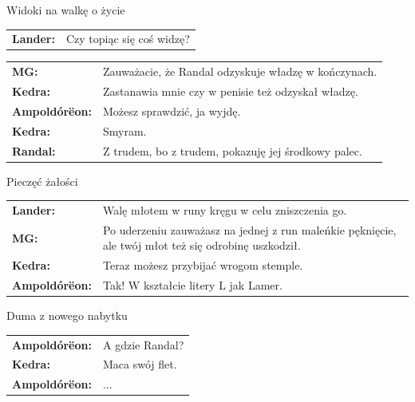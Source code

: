 \documentclass[10pt,twoside,twocolumn]{book}
\begin{document}
\begin{rpg-quotebox}{Widoki na walkę o życie}
   \begin{tabularx}{\columnwidth}{lX}
      \textbf{Lander:} & Czy topiąc się coś widzę?\\
   \end{tabularx}
\end{rpg-quotebox}


\begin{rpg-quotebox}{}
   \begin{tabularx}{\columnwidth}{lX}
      \textbf{MG:} & Zauważacie, że Randal odzyskuje władzę w kończynach.\\
      \textbf{Kedra:} & Zastanawia mnie czy w penisie też odzyskał władzę.\\
      \textbf{Ampoldórëon:} & Możesz sprawdzić, ja wyjdę.\\
      \textbf{Kedra:} & Smyram.\\
      \textbf{Randal:} & Z trudem, bo z trudem, pokazuję jej środkowy palec.\\
   \end{tabularx}
\end{rpg-quotebox}


\begin{rpg-quotebox}{Pieczęć żałości}
   \begin{tabularx}{\columnwidth}{lX}
      \textbf{Lander:} & Walę młotem w runy kręgu w celu zniszczenia go.\\
      \textbf{MG:} & Po uderzeniu zauważasz na jednej z run maleńkie pęknięcie, ale twój młot też się odrobinę uszkodził.\\
      \textbf{Kedra:} & Teraz możesz przybijać wrogom stemple.\\
      \textbf{Ampoldórëon:} & Tak! W kształcie litery L jak Lamer.\\
   \end{tabularx}
\end{rpg-quotebox}


\begin{rpg-quotebox}{Duma z nowego nabytku}
   \begin{tabularx}{\columnwidth}{lX}
\textbf{Ampoldórëon:} & A gdzie Randal?\\
\textbf{Kedra:} & Maca swój flet.\\
\textbf{Ampoldórëon:} & ...\\
   \end{tabularx}
\end{rpg-quotebox}
\end{document}
